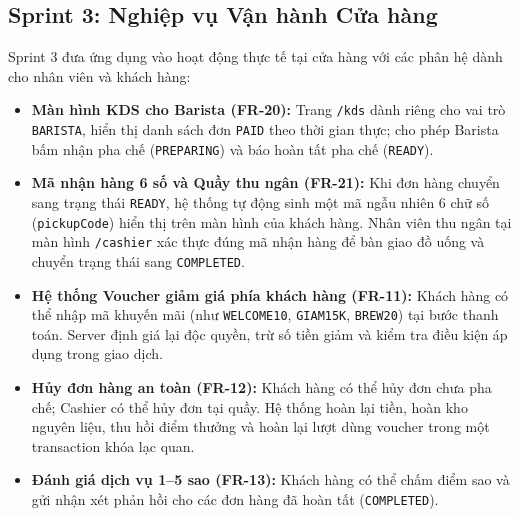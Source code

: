 \documentclass[12pt, a4paper]{article}
\begin{document}
\subsection{Sprint 3: Nghiệp vụ Vận hành Cửa hàng}
Sprint 3 đưa ứng dụng vào hoạt động thực tế tại cửa hàng với các phân hệ dành cho nhân viên và khách hàng:
\begin{itemize}
  \item \textbf{Màn hình KDS cho Barista (FR-20):} Trang \texttt{/kds} dành riêng cho vai trò \texttt{BARISTA}, hiển thị danh sách đơn \texttt{PAID} theo thời gian thực; cho phép Barista bấm nhận pha chế (\texttt{PREPARING}) và báo hoàn tất pha chế (\texttt{READY}).
  \item \textbf{Mã nhận hàng 6 số và Quầy thu ngân (FR-21):} Khi đơn hàng chuyển sang trạng thái \texttt{READY}, hệ thống tự động sinh một mã ngẫu nhiên 6 chữ số (\texttt{pickupCode}) hiển thị trên màn hình của khách hàng. Nhân viên thu ngân tại màn hình \texttt{/cashier} xác thực đúng mã nhận hàng để bàn giao đồ uống và chuyển trạng thái sang \texttt{COMPLETED}.
  \item \textbf{Hệ thống Voucher giảm giá phía khách hàng (FR-11):} Khách hàng có thể nhập mã khuyến mãi (như \texttt{WELCOME10}, \texttt{GIAM15K}, \texttt{BREW20}) tại bước thanh toán. Server định giá lại độc quyền, trừ số tiền giảm và kiểm tra điều kiện áp dụng trong giao dịch.
  \item \textbf{Hủy đơn hàng an toàn (FR-12):} Khách hàng có thể hủy đơn chưa pha chế; Cashier có thể hủy đơn tại quầy. Hệ thống hoàn lại tiền, hoàn kho nguyên liệu, thu hồi điểm thưởng và hoàn lại lượt dùng voucher trong một transaction khóa lạc quan.
  \item \textbf{Đánh giá dịch vụ 1--5 sao (FR-13):} Khách hàng có thể chấm điểm sao và gửi nhận xét phản hồi cho các đơn hàng đã hoàn tất (\texttt{COMPLETED}).
\end{itemize}
\end{document}
